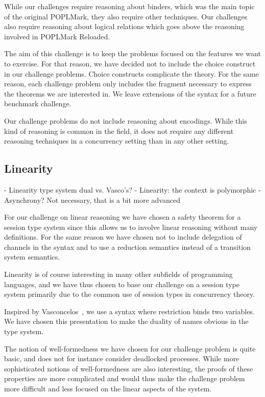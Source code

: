 \documentclass[runningheads]{llncs}
\begin{document}
While our challenges require reasoning about binders, which was the main topic of the original POPLMark, they also require other techniques.
Our challenges also require reasoning about logical relations which goes above the reasoning involved in POPLMark Reloaded.

The aim of this challenge is to keep the problems focused on the
features we want to exercise. For that reason, we have decided not to
include the choice construct in our challenge problems. Choice
constructs complicate the theory. For the same reason, each challenge
problem only includes the fragment necessary to express the theorems
we are interested in. We leave extensions of the syntax for a future
benchmark challenge.

Our challenge problems do not include reasoning about encodings. While
this kind of reasoning is common in the field, it does not require any
different reasoning techniques in a concurrency setting than in any
other setting.

\subsection{Linearity}
- Linearity type system dual vs. Vasco's?
- Linearity: the context is polymorphic
- Asynchrony? Not necessary, that is a bit more advanced

For our challenge on linear reasoning we have chosen a safety theorem for a session type system since this allows us to involve linear reasoning without many definitions.
For the same reason we have chosen not to include delegation of channels in the syntax and to use a reduction semantics instead of a transition system semantics.

Linearity is of course interesting in many other subfields of programming languages, and we have thus chosen to base our challenge on a  session type system primarily due to the common use of session types in concurrency theory.

Inspired by Vasconcelos~\cite{Vasconcelos2012}, we use a syntax where restriction binds two variables.
We have chosen this presentation to make the duality of names obvious in the type system.

The notion of well-formedness we have chosen for our challenge problem is quite basic, and does not for instance consider deadlocked processes.
While more sophisticated notions of well-formedness are also interesting, the proofs of these properties are more complicated and would thus make the challenge problem more difficult and less focused on the linear aspects of the system.
\end{document}
